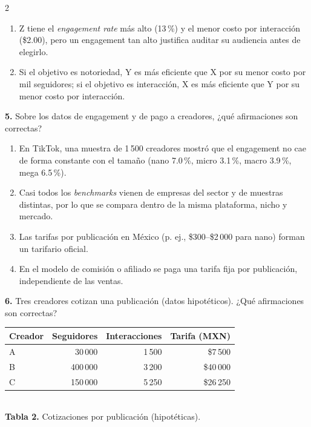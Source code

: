 \documentclass[10pt,letterpaper]{article}
\newcommand{\cas}{\framebox[1.0em]{\rule{0pt}{1.05ex}}}
\begin{document}
\begin{multicols}{2}
\begin{minipage}[t]{\columnwidth}
\begin{enumerate}[label=\cas\ \alph*),leftmargin=2.3em,itemsep=1.2pt,topsep=1pt,parsep=0pt,partopsep=0pt]
\item Z tiene el \textit{engagement rate} más alto (13\,\%) y el menor costo por interacción (\$2.00), pero un engagement tan alto justifica auditar su audiencia antes de elegirlo.
\item Si el objetivo es notoriedad, Y es más eficiente que X por su menor costo por mil seguidores; si el objetivo es interacción, X es más eficiente que Y por su menor costo por interacción.
\end{enumerate}\end{minipage}\par\vspace{3pt}
\begin{minipage}[t]{\columnwidth}\noindent\textbf{5.} Sobre los datos de engagement y de pago a creadores, ¿qué afirmaciones son correctas?
\vspace{1pt}\begin{enumerate}[label=\cas\ \alph*),leftmargin=2.3em,itemsep=1.2pt,topsep=1pt,parsep=0pt,partopsep=0pt]
\item En TikTok, una muestra de 1\,500 creadores mostró que el engagement no cae de forma constante con el tamaño (nano 7.0\,\%, micro 3.1\,\%, macro 3.9\,\%, mega 6.5\,\%).
\item Casi todos los \textit{benchmarks} vienen de empresas del sector y de muestras distintas, por lo que se compara dentro de la misma plataforma, nicho y mercado.
\item Las tarifas por publicación en México (p. ej., \$300--\$2\,000 para nano) forman un tarifario oficial.
\item En el modelo de comisión o afiliado se paga una tarifa fija por publicación, independiente de las ventas.
\end{enumerate}\end{minipage}\par\vspace{3pt}
\begin{minipage}[t]{\columnwidth}\noindent\textbf{6.} Tres creadores cotizan una publicación (datos hipotéticos). ¿Qué afirmaciones son correctas?
\begin{center}{\scriptsize\renewcommand{\arraystretch}{1.05}\begin{tabular}{@{}lrrr@{}}\toprule
Creador & Seguidores & Interacciones & Tarifa (MXN)\\\midrule
A & 30\,000 & 1\,500 & \$7\,500\\ B & 400\,000 & 3\,200 & \$40\,000\\ C & 150\,000 & 5\,250 & \$26\,250\\\bottomrule\end{tabular}}\\[1pt]{\tiny\textbf{Tabla 2.} Cotizaciones por publicación (hipotéticas).}\end{center}

\end{minipage}
\end{multicols}
\end{document}
